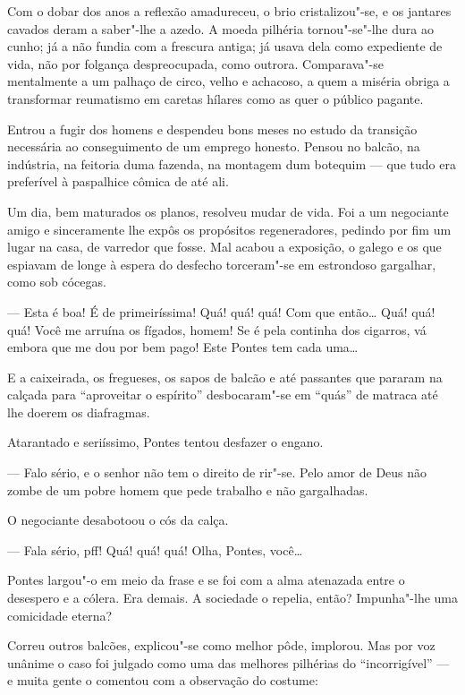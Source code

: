 Com o dobar dos anos a reflexão amadureceu, o brio cristalizou"-se, e os
jantares cavados deram a saber"-lhe a azedo. A moeda pilhéria
tornou"-se"-lhe dura ao cunho; já a não fundia com a frescura antiga; já
usava dela como expediente de vida, não por folgança despreocupada, como
outrora. Comparava"-se mentalmente a um palhaço de circo, velho e
achacoso, a quem a miséria obriga a transformar reumatismo em caretas
hílares como as quer o público pagante.

Entrou a fugir dos homens e despendeu bons meses no estudo da transição
necessária ao conseguimento de um emprego honesto. Pensou no balcão, na
indústria, na feitoria duma fazenda, na montagem dum botequim --- que
tudo era preferível à paspalhice cômica de até ali.

Um dia, bem maturados os planos, resolveu mudar de vida. Foi a um
negociante amigo e sinceramente lhe expôs os propósitos regeneradores,
pedindo por fim um lugar na casa, de varredor que fosse. Mal acabou a
exposição, o galego e os que espiavam de longe à espera do desfecho
torceram"-se em estrondoso gargalhar, como sob cócegas.

--- Esta é boa! É de primeiríssima! Quá! quá! quá! Com que então\ldots{} Quá!
quá! quá! Você me arruína os fígados, homem! Se é pela continha dos
cigarros, vá embora que me dou por bem pago! Este Pontes tem cada uma\ldots{}

E a caixeirada, os fregueses, os sapos de balcão e até passantes que
pararam na calçada para ``aproveitar o espírito'' desbocaram"-se em
``quás'' de matraca até lhe doerem os diafragmas.

Atarantado e seriíssimo, Pontes tentou desfazer o engano.

--- Falo sério, e o senhor não tem o direito de rir"-se. Pelo amor de
Deus não zombe de um pobre homem que pede trabalho e não gargalhadas.

O negociante desabotoou o cós da calça.

--- Fala sério, pff! Quá! quá! quá! Olha, Pontes, você\ldots{}

Pontes largou"-o em meio da frase e se foi com a alma atenazada entre o
desespero e a cólera. Era demais. A sociedade o repelia, então?
Impunha"-lhe uma comicidade eterna?

Correu outros balcões, explicou"-se como melhor pôde, implorou. Mas por
voz unânime o caso foi julgado como uma das melhores pilhérias do
``incorrigível'' --- e muita gente o comentou com a observação do
costume:

